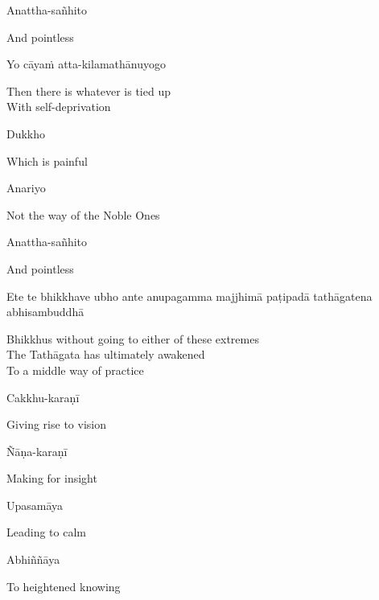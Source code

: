 Anattha-sañhito

\begin{english}
  And pointless
\end{english}

Yo cāyaṁ atta-kilamathānuyogo

\begin{english}
  Then there is whatever is tied up\\
  With self-deprivation
\end{english}

Dukkho

\begin{english}
  Which is painful
\end{english}

Anariyo

\begin{english}
  Not the way of the Noble Ones
\end{english}

Anattha-sañhito

\begin{english}
  And pointless
\end{english}

Ete te bhikkhave ubho ante anupagamma majjhimā paṭipadā tathāgatena abhisambuddhā

\begin{english}
  Bhikkhus without going to either of these extremes\\
  The Tathāgata has ultimately awakened\\
  To a middle way of practice
\end{english}

Cakkhu-karaṇī

\begin{english}
  Giving rise to vision
\end{english}

Ñāṇa-karaṇī

\begin{english}
  Making for insight
\end{english}

Upasamāya

\begin{english}
  Leading to calm
\end{english}

Abhiññāya

\begin{english}
  To heightened knowing
\end{english}

